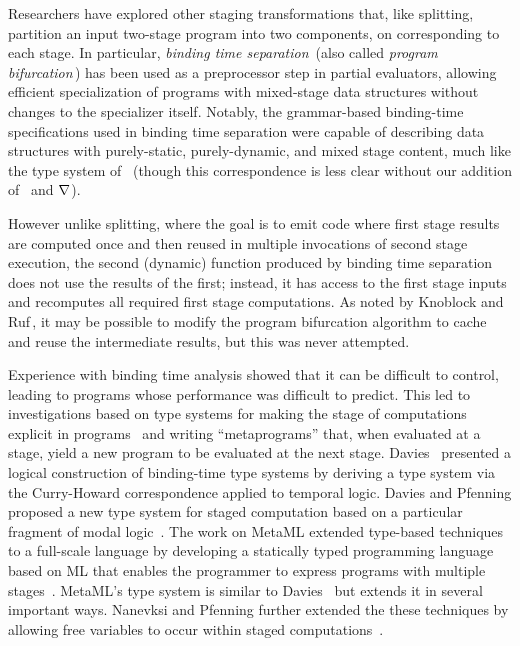 Researchers have explored other staging transformations that, 
like splitting, partition an input two-stage program into two components,
on corresponding to each stage.  
In particular, \emph{binding time separation}\,\cite{Mogensen89a} 
(also called \emph{program bifurcation}\,\cite{DeNiel91})
has been used as a preprocessor step in partial evaluators,
allowing efficient specialization of programs with 
mixed-stage data structures without changes to the specializer itself.
Notably, the grammar-based binding-time specifications used in binding 
time separation were capable of describing
data structures with purely-static, purely-dynamic, and mixed stage
content, much like the type system of \lang\
(though this correspondence is less clear without our addition of 
\bbonep\ and $\nabla$).

However unlike splitting, where the goal is to emit code where first stage results
are computed once and then reused in multiple invocations of second
stage execution, the second (dynamic) function produced by binding time separation
does not use the results of the first; instead,
it has access to the first stage inputs and recomputes all required
first stage computations. As noted by Knoblock and
Ruf\,\cite{knoblock96}, it may be possible to modify the program
bifurcation algorithm to cache and reuse the intermediate results, but
this was never attempted.

Experience with binding time analysis showed that it can be difficult
to control, leading to programs whose performance was difficult to
predict. This led to investigations based on type systems for making
the stage of computations explicit in
programs~\cite{GJ91-lambda,NN92-twolevel} and writing ``metaprograms''
that, when evaluated at a stage, yield a new program to be evaluated
at the next stage.  Davies~\cite{davies96} presented a logical
construction of binding-time type systems by deriving a type system
via the Curry-Howard correspondence applied to temporal logic.  Davies
and Pfenning proposed a new type system for staged computation based
on a particular fragment of modal logic~\cite{DP01-modal}. The work on
MetaML extended type-based techniques to a full-scale language by
developing a statically typed programming language based on ML that
enables the programmer to express programs with multiple
stages~\cite{Taha97,taha-thesis-99}.  MetaML's type system is similar
to Davies~\cite{davies96} but extends it in several important ways.
Nanevksi and Pfenning further extended the these techniques by
allowing free variables to occur within staged
computations~\cite{NP05-nn}.

